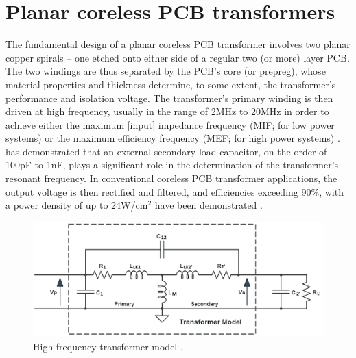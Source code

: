 \documentclass[conference]{IEEEtran}
\begin{document}
\section{Planar coreless PCB transformers}
\label{sec:corelessPCBTransformers}

The fundamental design of a planar coreless PCB transformer involves two planar copper spirals -- one etched onto either side of a regular two (or more) layer PCB.  The two windings are thus separated by the PCB's core (or prepreg), whose material properties and thickness determine, to some extent, the transformer's performance and isolation voltage.  The transformer's primary winding is then driven at high frequency, usually in the range of 2MHz to 20MHz in order to achieve either the maximum [input] impedance frequency (MIF; for low power systems) or the maximum efficiency frequency (MEF; for high power systems) \cite{TangHuiFundamental,NaturallySoft,OptimalOperation,CorelessGateDrive}.  \cite{TangHuiFundamental} has demonstrated that an external secondary load capacitor, on the order of 100pF to 1nF, plays a significant role in the determination of the transformer's resonant frequency.  In conventional coreless PCB transformer applications, the output voltage is then rectified and filtered, and efficiencies exceeding 90\%, with a power density of up to 24W/cm$^{2}$ have been demonstrated \cite{TangHuiFundamental}.

%
\begin{figure}[t]
	\centering
	\includegraphics[width=1\columnwidth]{./img/HF_Model}
	\caption{High-frequency transformer model \cite{TangHuiFundamental}.}
	\label{fig:HF-Model}
\end{figure}
\end{document}
